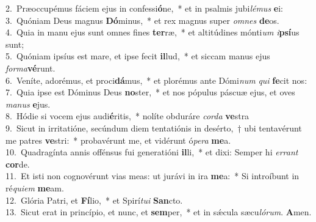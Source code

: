 {2.~}Præoccupémus fáciem ejus in confessi\textbf{ó}ne,~* et in psalmis jubi\textit{lé}\textit{mus} \textbf{e}i:\\
{3.~}Quóniam Deus magnus \textbf{Dó}minus,~* et rex magnus super \textit{om}\textit{nes} \textbf{de}os.\\
{4.~}Quia in manu ejus sunt omnes fines \textbf{ter}ræ,~* et altitúdines mónti\textit{um} \textit{i}\textbf{psí}us sunt;\\
{5.~}Quóniam ipsíus est mare, et ipse fecit \textbf{il}lud,~* et siccam manus ejus \textit{for}\textit{ma}\textbf{vé}runt.\\
{6.~}Veníte, adorémus, et proci\textbf{dá}mus,~* et plorémus ante Dómi\textit{num} \textit{qui} \textbf{fe}cit nos:\\
{7.~}Quia ipse est Dóminus Deus \textbf{no}ster,~* et nos pópulus páscuæ ejus, et oves \textit{ma}\textit{nus} \textbf{e}jus.\\
{8.~}Hódie si vocem ejus audi\textbf{é}ritis,~* nolíte obduráre \textit{cor}\textit{da} \textbf{ve}stra\\
{9.~}Sicut in irritatióne, secúndum diem tentatiónis in desérto,~† ubi tentavérunt me patres \textbf{ve}stri:~* probavérunt me, et vidérunt ó\textit{pe}\textit{ra} \textbf{me}a.\\
{10.~}Quadragínta annis offénsus fui generatióni \textbf{il}li,~* et dixi: Semper hi \textit{er}\textit{rant} \textbf{cor}de.\\
{11.~}Et isti non cognovérunt vias meas: ut jurávi in ira \textbf{me}a:~* Si introíbunt in ré\textit{qui}\textit{em} \textbf{me}am.\\
{12.~}Glória Patri, et \textbf{Fí}lio,~* et Spirí\textit{tu}\textit{i} \textbf{San}cto.\\
{13.~}Sicut erat in princípio, et nunc, et \textbf{sem}per,~* et in sǽcula sæcu\textit{ló}\textit{rum}. \textbf{A}men.\\
